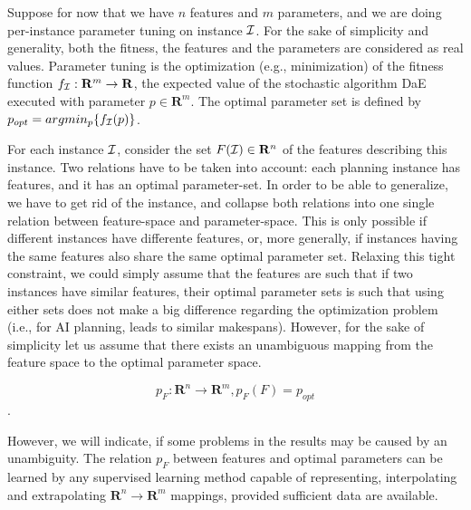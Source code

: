 \documentclass{MYsig-alternate}
\begin{document}
Suppose for now that we have $n$ features and $m$ parameters, and we are doing per-instance parameter tuning on instance $\cal I$. For the sake of simplicity and generality, both the fitness, the features and the parameters are considered as real values. Parameter tuning is the optimization (e.g., minimization) of the fitness function \begin{math}f_{\cal I}:\mathbf{R}^m\to \mathbf{R} \end{math}, the expected value of the stochastic algorithm DaE executed with parameter \begin{math} p \in \mathbf{R}^m \end{math}. The optimal parameter set is defined by \begin{math} p_{opt}=argmin_p\{f_{\cal I}(p)\} \end{math}. 

For each instance $\cal I$, consider the set \begin{math} F({\cal I}) \in \mathbf{R}^n \end{math} of the features describing this instance. 
Two relations have to be taken into account: each planning instance has features, and it has an optimal parameter-set. In order to be able to generalize, we have to get rid of the instance, and collapse both relations into one single relation between feature-space and parameter-space. This is only possible if different instances have differente features, or, more generally, if instances having the same features also share the same optimal parameter set. Relaxing this tight constraint, we could simply assume that the features are such that if two instances have similar features, their optimal parameter sets is such that using either sets does not make a big difference regarding the optimization problem (i.e., for AI planning, leads to similar makespans). However, for the sake of simplicity let us assume that there exists an unambiguous mapping from the feature space to the optimal parameter space. 

\begin{equation} p_F: \mathbf{R}^n \to \mathbf{R}^m, p_F(F)=p_{opt} \end{equation}.	

However, we will indicate, if some problems in the results may be caused by an unambiguity. The relation \begin{math} p_F \end{math} between features and optimal parameters can be learned by any supervised learning method capable of representing, interpolating and extrapolating  \begin{math}\mathbf{R}^n\to \mathbf{R}^m \end{math} mappings, provided sufficient data are available.
\end{document}
